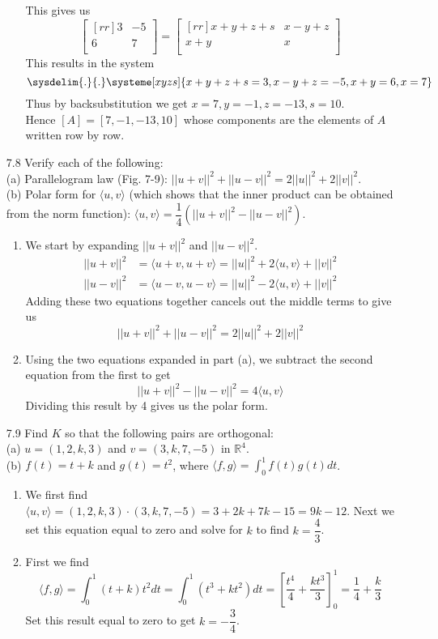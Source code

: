 \documentclass[12pt]{article}
\theoremstyle{plain}
\theoremstyle{definition}
\theoremstyle{plain}
\begin{document}
\begin{enumerate}
\begin{enumerate}
		This gives us
		\[ \begin{bmatrix}[rr]3&-5\\6&7\\\end{bmatrix} = \begin{bmatrix}[rr]x+y+z+s&x-y+z\\x+y&x\\\end{bmatrix} \]
		This results in the system
		\[ \sysdelim{.}{.}\systeme[xyzs]{x+y+z+s=3,x-y+z=-5,x+y=6,x=7} \]
		Thus by backsubstitution we get $x=7,y=-1,z=-13,s=10$.\\
		Hence $[A]=[7,-1,-13,10]$ whose components are the elements of $A$ written row by row.
	\end{enumerate}
	
\item[7.8]Verify each of the following:\\
(a) Parallelogram law (Fig. 7-9): $||u+v||^2 + ||u-v||^2 = 2||u||^2 + 2||v||^2$.\\
(b) Polar form for $\langle u,v \rangle$ (which shows that the inner product can be obtained from the norm function): $\langle u,v\rangle=\dfrac{1}{4}(||u+v||^2-||u-v||^2)$.
	\begin{enumerate}
	\item We start by expanding $||u+v||^2$ and $||u-v||^2$.
		\begin{align*}
		||u+v||^2 &= \langle u+v,u+v \rangle = ||u||^2 + 2\langle u,v \rangle + ||v||^2\\
		||u-v||^2 &= \langle u-v, u-v \rangle = ||u||^2 - 2\langle u,v \rangle + ||v||^2
		\end{align*}
		Adding these two equations together cancels out the middle terms to give us
		\[ ||u+v||^2+||u-v||^2 = 2||u||^2 + 2||v||^2 \]
	\item Using the two equations expanded in part (a), we subtract the second equation from the first to get
		\[ ||u+v||^2 - ||u-v||^2 = 4\langle u,v \rangle \]
		Dividing this result by 4 gives us the polar form.
	\end{enumerate}
	
\item[7.9]Find $K$ so that the following pairs are orthogonal:\\
(a) $u=(1,2,k,3)$ and $v=(3,k,7,-5)$ in $\mathbb{R}^4$.\\
(b) $f(t) = t+k$ and $g(t)=t^2$, where $\langle f,g\rangle = \int_0^1f(t)g(t)dt$.
	\begin{enumerate}
	\item We first find $\langle u,v \rangle = (1,2,k,3)\cdot (3,k,7,-5) = 3+2k+7k-15 = 9k-12$. Next we set this equation equal to zero and solve for $k$ to find $k=\dfrac{4}{3}$.
	\item First we find
		\[ \langle f,g \rangle = \int_0^1(t+k)t^2dt = \int_0^1(t^3+kt^2)dt = \left[ \dfrac{t^4}{4}+\dfrac{kt^3}{3}\right]_0^1 = \dfrac{1}{4}+\dfrac{k}{3} \]
		Set this result equal to zero to get $k=-\dfrac{3}{4}$.
	\end{enumerate}
	

\end{enumerate}
\end{document}
